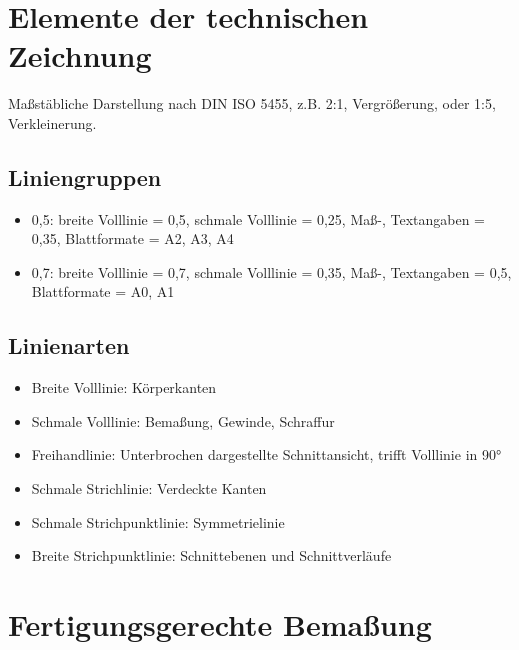 \documentclass[a4paper,parskip=half*,DIV=7,fontsize=11pt]{scrartcl}
\begin{document}
\section{Elemente der technischen Zeichnung}
Maßstäbliche Darstellung nach DIN ISO 5455, z.B. 2:1, Vergrößerung, oder 1:5, Verkleinerung.
	
\subsection{Liniengruppen}
\begin{itemize}
	\item 0,5: breite Volllinie = 0,5, schmale Volllinie = 0,25, Maß-, Textangaben = 0,35, Blattformate = A2, A3, A4
	\item 0,7: breite Volllinie = 0,7, schmale Volllinie = 0,35, Maß-, Textangaben = 0,5, Blattformate = A0, A1
\end{itemize}
	
\subsection{Linienarten}
\begin{itemize}
	\item Breite Volllinie: Körperkanten
	\item Schmale Volllinie: Bemaßung, Gewinde, Schraffur
	\item Freihandlinie: Unterbrochen dargestellte Schnittansicht, trifft Volllinie in 90°
	\item Schmale Strichlinie: Verdeckte Kanten
	\item Schmale Strichpunktlinie: Symmetrielinie
	\item Breite Strichpunktlinie: Schnittebenen und Schnittverläufe
\end{itemize}
	
\section{Fertigungsgerechte Bemaßung}
\end{document}
